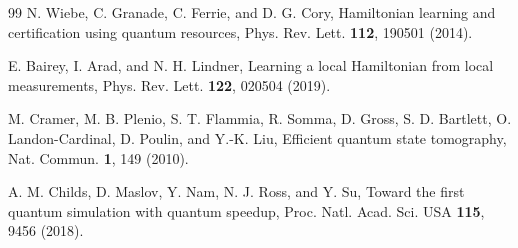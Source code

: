 \documentclass[10pt,letterpaper,twoside]{article}
\begin{document}
\begin{thebibliography}{99}
N. Wiebe, C. Granade, C. Ferrie, and D. G. Cory, Hamiltonian learning and
certification using quantum resources, Phys. Rev. Lett. \textbf{112}, 190501
(2014).

E. Bairey, I. Arad, and N. H. Lindner, Learning a local Hamiltonian from local
measurements, Phys. Rev. Lett. \textbf{122}, 020504 (2019).

M. Cramer, M. B. Plenio, S. T. Flammia, R. Somma, D. Gross,
S. D. Bartlett, O. Landon-Cardinal, D. Poulin, and Y.-K. Liu,
Efficient quantum state tomography, Nat. Commun. \textbf{1}, 149 (2010).

A. M. Childs, D. Maslov, Y. Nam, N. J. Ross, and Y. Su,
Toward the first quantum simulation with quantum speedup,
Proc. Natl. Acad. Sci. USA \textbf{115}, 9456 (2018).

\end{thebibliography}
\end{document}
